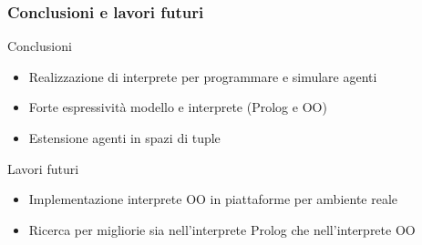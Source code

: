 \documentclass[handout]{beamer}\mode<presentation>{\usetheme{AMSCesenaBleu}}
\begin{document}
\begin{frame}
\frametitle{Conclusioni e lavori futuri}
\begin{block}{Conclusioni}
\begin{itemize}
\item Realizzazione di interprete per programmare e simulare agenti
\item Forte espressività modello e interprete (Prolog e OO)
\item Estensione agenti in spazi di tuple 
\end{itemize}
\end{block}
\begin{block}{Lavori futuri}
\begin{itemize}
\item Implementazione interprete OO in piattaforme per ambiente reale
\item Ricerca per migliorie sia nell'interprete Prolog che nell'interprete OO
\end{itemize}
\end{block}
\end{frame}

\section{}
\subsection{}
\maketitle
\end{document}
